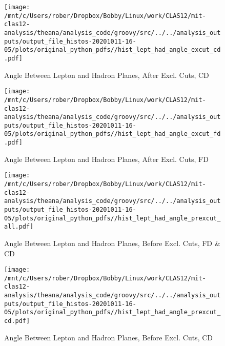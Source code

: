 \documentclass{article}
\begin{document}
\begin{landscape}
    \begin{figure}[h]
        \centering

        \texttt{[image: /mnt/c/Users/rober/Dropbox/Bobby/Linux/work/CLAS12/mit-clas12-analysis/theana/analysis\_code/groovy/src/../../analysis\_outputs/output\_file\_histos-20201011-16-05/plots/original\_python\_pdfs//hist\_lept\_had\_angle\_excut\_cd.pdf]}
        \captionsetup{textformat=empty,labelformat=blank}
        \caption{Angle Between Lepton and Hadron Planes, After Excl. Cuts, CD}
    \end{figure}
    \clearpage
    
    \begin{figure}[h]
        \centering

        \texttt{[image: /mnt/c/Users/rober/Dropbox/Bobby/Linux/work/CLAS12/mit-clas12-analysis/theana/analysis\_code/groovy/src/../../analysis\_outputs/output\_file\_histos-20201011-16-05/plots/original\_python\_pdfs//hist\_lept\_had\_angle\_excut\_fd.pdf]}
        \captionsetup{textformat=empty,labelformat=blank}
        \caption{Angle Between Lepton and Hadron Planes, After Excl. Cuts, FD}
    \end{figure}
    \clearpage
    
    \begin{figure}[h]
        \centering

        \texttt{[image: /mnt/c/Users/rober/Dropbox/Bobby/Linux/work/CLAS12/mit-clas12-analysis/theana/analysis\_code/groovy/src/../../analysis\_outputs/output\_file\_histos-20201011-16-05/plots/original\_python\_pdfs//hist\_lept\_had\_angle\_prexcut\_all.pdf]}
        \captionsetup{textformat=empty,labelformat=blank}
        \caption{Angle Between Lepton and Hadron Planes, Before Excl. Cuts, FD \& CD}
    \end{figure}
    \clearpage
    
    \begin{figure}[h]
        \centering

        \texttt{[image: /mnt/c/Users/rober/Dropbox/Bobby/Linux/work/CLAS12/mit-clas12-analysis/theana/analysis\_code/groovy/src/../../analysis\_outputs/output\_file\_histos-20201011-16-05/plots/original\_python\_pdfs//hist\_lept\_had\_angle\_prexcut\_cd.pdf]}
        \captionsetup{textformat=empty,labelformat=blank}
        \caption{Angle Between Lepton and Hadron Planes, Before Excl. Cuts, CD}
    \end{figure}
    \clearpage
    
    \begin{figure}[h]
        \centering


\end{figure}
\end{landscape}
\end{document}

